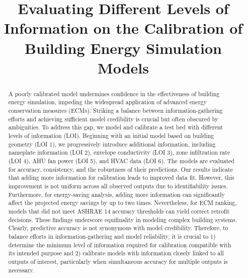 \documentclass[3p,times,12pt]{elsarticle}
\begin{document}
\begin{sloppypar}

\begin{frontmatter}


\title{Evaluating Different Levels of Information on the Calibration of Building Energy Simulation Models}




\begin{abstract}
A poorly calibrated model undermines confidence in the effectiveness of building energy simulation, impeding the widespread application of advanced energy conservation measures (ECMs). Striking a balance between information-gathering efforts and achieving sufficient model credibility is crucial but often obscured by ambiguities. To address this gap, we model and calibrate a test bed with different levels of information (LOI). Beginning with an initial model based on building geometry (LOI 1), we progressively introduce additional information, including nameplate information (LOI 2), envelope conductivity (LOI 3), zone infiltration rate (LOI 4), AHU fan power (LOI 5), and HVAC data (LOI 6). The models are evaluated for accuracy, consistency, and the robustness of their predictions. Our results indicate that adding more information for calibration leads to improved data fit. However, this improvement is not uniform across all observed outputs due to identifiability issues. Furthermore, for energy-saving analysis, adding more information can significantly affect the projected energy savings by up to two times. Nevertheless, for ECM ranking, models that did not meet ASHRAE 14 accuracy thresholds can yield correct retrofit decisions. These findings underscore equifinality in modeling complex building systems. Clearly, predictive accuracy is not synonymous with model credibility. Therefore, to balance efforts in information-gathering and model reliability, it is crucial to 1) determine the minimum level of information required for calibration compatible with its intended purpose and 2) calibrate models with information closely linked to all outputs of interest, particularly when simultaneous accuracy for multiple outputs is necessary.


\end{abstract}
\end{frontmatter}
\end{sloppypar}
\end{document}
